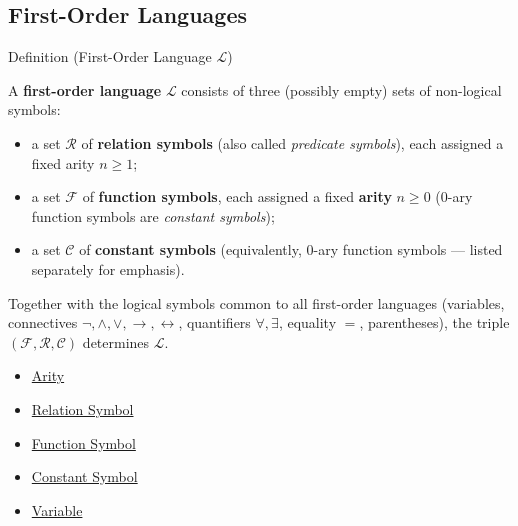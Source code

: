 

\vspace{0.5em}


\subsection*{First-Order Languages}

\begin{definitionbox}{Definition (First-Order Language $\mathcal{L}$)}
\begin{definition}\label{def:first-order-language}
A \textbf{first-order language} $\mathcal{L}$ consists of three (possibly
empty) sets of non-logical symbols:
\begin{itemize}
  \item a set $\mathcal{R}$ of \textbf{relation symbols} (also called
        \emph{predicate symbols}), each assigned a fixed arity $n \geq 1$;
  \item a set $\mathcal{F}$ of \textbf{function symbols}, each assigned a
        fixed \textbf{arity} $n \geq 0$ (0-ary function symbols are
        \emph{constant symbols});
  \item a set $\mathcal{C}$ of \textbf{constant symbols} (equivalently,
        0-ary function symbols — listed separately for emphasis).
\end{itemize}
Together with the logical symbols common to all first-order languages
(variables, connectives $\lnot, \land, \lor, \to, \leftrightarrow$,
quantifiers $\forall, \exists$, equality $=$, parentheses), the triple
$(\mathcal{F}, \mathcal{R}, \mathcal{C})$ determines $\mathcal{L}$.
\end{definition}
\end{definitionbox}

\begin{dependencies}
\begin{itemize}
  \item \hyperref[def:arity]{Arity}
  \item \hyperref[def:relation-symbol]{Relation Symbol}
  \item \hyperref[def:function-symbol]{Function Symbol}
  \item \hyperref[def:constant-symbol]{Constant Symbol}
  \item \hyperref[def:variable]{Variable}
\end{itemize}
\end{dependencies}

